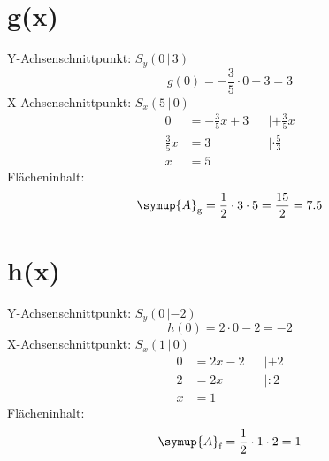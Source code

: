 \section*{g(x)}
Y-Achsenschnittpunkt: $S_y (0\,|\,3)$
\begin{equation}
      g(0) = -\frac{3}{5}\cdot0 + 3 = 3
\end{equation}
X-Achsenschnittpunkt: $S_x (5\,|\,0)$
\begin{align}
    0 &= -\frac{3}{5}x + 3 && | + \frac{3}{5}x \\
      \frac{3}{5}x &= 3 && | \cdot \frac{5}{3} \\
      x &= 5
\end{align}
Flächeninhalt:
\begin{equation}
      \symup{A}_\text{g} = \frac{1}{2} \cdot 3 \cdot 5
            = \frac{15}{2} = 7.5
\end{equation}

\section*{h(x)}
Y-Achsenschnittpunkt: $S_y (0\,|-2)$
\begin{equation}
      h(0) = 2\cdot0 - 2 = -2
\end{equation}
X-Achsenschnittpunkt: $S_x (1\,|\,0)$
\begin{align}
      0 &= 2x - 2 && | +2 \\
      2 &= 2x && | :2\\
      x &= 1
\end{align}
Flächeninhalt:
\begin{equation}
      \symup{A}_\text{f} = \frac{1}{2} \cdot 1 \cdot 2 = 1
\end{equation}

